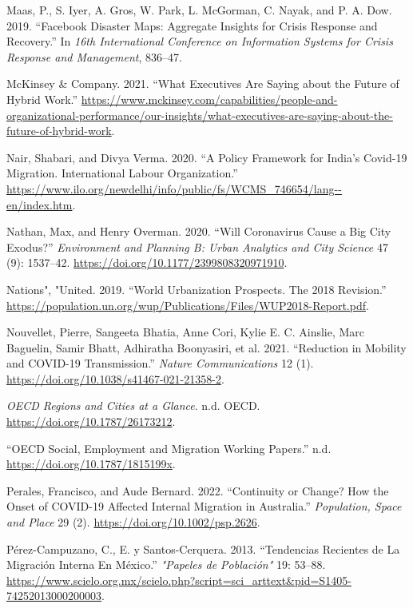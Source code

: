 \documentclass[11pt,letterpaper]{article}
\newlength{\cslhangindent}
\newlength{\cslentryspacingunit} %
\newenvironment{CSLReferences}[2] %
 {%
  \setlength{\parindent}{0pt}
  \ifodd #1
  \let\oldpar\par
  \def\par{\hangindent=\cslhangindent\oldpar}
  \fi
  \setlength{\parskip}{#2\cslentryspacingunit}
 }%
 {}
\begin{document}
\begin{CSLReferences}{1}{0}
Maas, P., S. Iyer, A. Gros, W. Park, L. McGorman, C. Nayak, and P. A.
Dow. 2019. {``Facebook Disaster Maps: Aggregate Insights for Crisis
Response and Recovery.''} In \emph{16th International Conference on
Information Systems for Crisis Response and Management}, 836--47.

McKinsey \& Company. 2021. {``What Executives Are Saying about the
Future of Hybrid Work.''}
\url{https://www.mckinsey.com/capabilities/people-and-organizational-performance/our-insights/what-executives-are-saying-about-the-future-of-hybrid-work}.

Nair, Shabari, and Divya Verma. 2020. {``A Policy Framework for India's
Covid-19 Migration. International Labour Organization.''}
\url{https://www.ilo.org/newdelhi/info/public/fs/WCMS_746654/lang--en/index.htm}.

Nathan, Max, and Henry Overman. 2020. {``Will Coronavirus Cause a Big
City Exodus?''} \emph{Environment and Planning B: Urban Analytics and
City Science} 47 (9): 1537--42.
\url{https://doi.org/10.1177/2399808320971910}.

Nations", "United. 2019. {``World Urbanization Prospects. The 2018
Revision.''}
\url{https://population.un.org/wup/Publications/Files/WUP2018-Report.pdf}.

Nouvellet, Pierre, Sangeeta Bhatia, Anne Cori, Kylie E. C. Ainslie, Marc
Baguelin, Samir Bhatt, Adhiratha Boonyasiri, et al. 2021. {``Reduction
in Mobility and COVID-19 Transmission.''} \emph{Nature Communications}
12 (1). \url{https://doi.org/10.1038/s41467-021-21358-2}.

\emph{OECD Regions and Cities at a Glance}. n.d. OECD.
\url{https://doi.org/10.1787/26173212}.

{``OECD Social, Employment and Migration Working Papers.''} n.d.
\url{https://doi.org/10.1787/1815199x}.

Perales, Francisco, and Aude Bernard. 2022. {``Continuity or Change? How
the Onset of COVID{-}19 Affected Internal Migration in Australia.''}
\emph{Population, Space and Place} 29 (2).
\url{https://doi.org/10.1002/psp.2626}.

Pérez-Campuzano, C., E. y Santos-Cerquera. 2013. {``Tendencias Recientes
de La Migración Interna En México.''} \emph{"Papeles de Población"} 19:
53--88.
\url{https://www.scielo.org.mx/scielo.php?script=sci_arttext&pid=S1405-74252013000200003}.


\end{CSLReferences}
\end{document}
